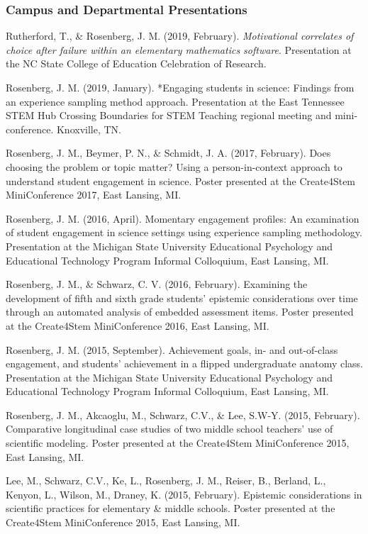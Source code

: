 \documentclass[14,]{article}
\begin{document}
\hypertarget{campus-and-departmental-presentations}{%
\subsubsection{Campus and Departmental
Presentations}\label{campus-and-departmental-presentations}}

Rutherford, T., \& Rosenberg, J. M. (2019, February). \emph{Motivational
correlates of choice after failure within an elementary mathematics
software}. Presentation at the NC State College of Education Celebration
of Research.

Rosenberg, J. M. (2019, January). *Engaging students in science:
Findings from an experience sampling method approach. Presentation at
the East Tennessee STEM Hub Crossing Boundaries for STEM Teaching
regional meeting and mini-conference. Knoxville, TN.

Rosenberg, J. M., Beymer, P. N., \& Schmidt, J. A. (2017, February).
Does choosing the problem or topic matter? Using a person-in-context
approach to understand student engagement in science. Poster presented
at the Create4Stem MiniConference 2017, East Lansing, MI.

Rosenberg, J. M. (2016, April). Momentary engagement profiles: An
examination of student engagement in science settings using experience
sampling methodology. Presentation at the Michigan State University
Educational Psychology and Educational Technology Program Informal
Colloquium, East Lansing, MI.

Rosenberg, J. M., \& Schwarz, C. V. (2016, February). Examining the
development of fifth and sixth grade students' epistemic considerations
over time through an automated analysis of embedded assessment items.
Poster presented at the Create4Stem MiniConference 2016, East Lansing,
MI.

Rosenberg, J. M. (2015, September). Achievement goals, in- and
out-of-class engagement, and students' achievement in a flipped
undergraduate anatomy class. Presentation at the Michigan State
University Educational Psychology and Educational Technology Program
Informal Colloquium, East Lansing, MI.

Rosenberg, J. M., Akcaoglu, M., Schwarz, C.V., \& Lee, S.W-Y. (2015,
February). Comparative longitudinal case studies of two middle school
teachers' use of scientific modeling. Poster presented at the
Create4Stem MiniConference 2015, East Lansing, MI.

Lee, M., Schwarz, C.V., Ke, L., Rosenberg, J. M., Reiser, B., Berland,
L., Kenyon, L., Wilson, M., Draney, K. (2015, February). Epistemic
considerations in scientific practices for elementary \& middle schools.
Poster presented at the Create4Stem MiniConference 2015, East Lansing,
MI.
\end{document}
